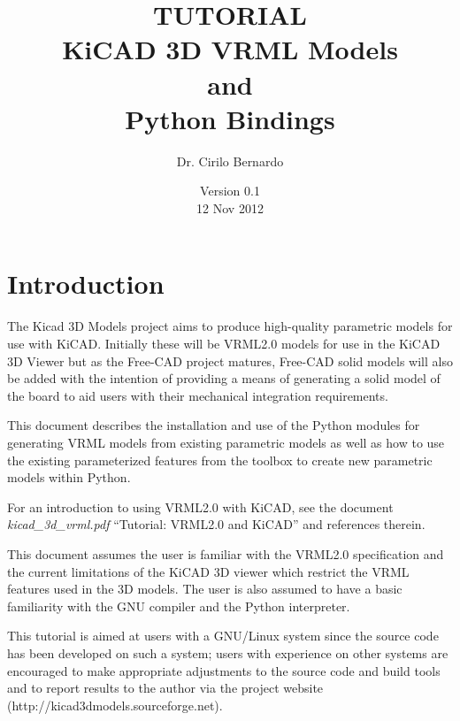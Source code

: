 \documentclass[a4paper, dvipdfm]{article}
\title{TUTORIAL\\
KiCAD 3D VRML Models\\
and\\
Python Bindings}
\date{Version 0.1\\
12 Nov 2012}
\author{Dr. Cirilo Bernardo}
\makeatletter
\def\maketitle{%
  \null
  \thispagestyle{empty}%
  \vfill
  \begin{center}\leavevmode
    \normalfont
{\LARGE \@title\par}%
    \vskip 1cm
{\Large \@author\par}%
    \vskip 1cm
{\Large \@date\par}%
  \end{center}%
  \vfill
  \null
  \cleardoublepage
}
\makeatother
\begin{document}
\maketitle

%
%

\setcounter{page}{1}

\section{Introduction}
The Kicad 3D Models project aims to produce high-quality parametric models for use
with KiCAD.  Initially these will be VRML2.0 models for use in the KiCAD 3D Viewer
but as the Free-CAD project matures, Free-CAD solid models will also be added with
the intention of providing a means of generating a solid model of the board to aid
users with their mechanical integration requirements.

This document describes the installation and use of the Python modules for generating
VRML models from existing parametric models as well as how to use the existing
parameterized features from the toolbox to create new parametric models within Python.

For an introduction to using VRML2.0 with KiCAD, see the document \emph{kicad\_3d\_vrml.pdf}
``Tutorial: VRML2.0 and KiCAD'' and references therein.

This document assumes the user is familiar with the VRML2.0 specification and the
current limitations of the KiCAD 3D viewer which restrict the VRML features used
in the 3D models. The user is also assumed to have a basic familiarity with
the GNU compiler and the Python interpreter.

This tutorial is aimed at users with a GNU/Linux system since the source code has
been developed on such a system; users with experience on other systems are
encouraged to make appropriate adjustments to the source code and build tools and
to report results to the author via the project website (http://kicad3dmodels.sourceforge.net).
\end{document}
